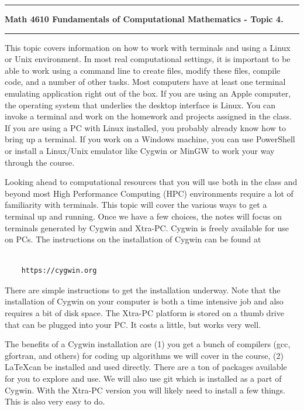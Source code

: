 \documentclass[10pt,fleqn]{article}
\begin{document}
\vskip0.1in\hrule\vskip0.1in
\noindent
{\bf Math 4610 Fundamentals of Computational Mathematics  - Topic 4.}
\vskip0.1in\hrule\vskip0.1in

This topic covers information on how to work with terminals and using a Linux
or Unix environment. In most real computational settings, it is important to be
able to work using a command line to create files, modify these files, compile
code, and a number of other tasks. Most computers have at least one terminal
emulating application right out of the box. If you are using an Apple computer,
the operating system that underlies the desktop interface is Linux. You can
invoke a terminal and work on the homework and projects assigned in the class.
If you are using a PC with Linux installed, you probably already know how to
bring up a terminal. If you work on a Windows machine, you can use PowerShell
or install a Linux/Unix emulator like Cygwin or MinGW to work your way through
the course.

Looking ahead to computational resources that you will use both in the class and
beyond most High Performance Computing (HPC) environments require a lot of
familiarity with terminals. This topic will cover the various ways to get a
terminal up and running. Once we have a few choices, the notes will focus on
terminals generated by Cygwin and Xtra-PC. Cygwin is freely available for use
on PCs. The instructions on the installation of Cygwin can be found at
\begin{verbatim}

    https://cygwin.org

\end{verbatim}
There are simple instructions to get the installation underway. Note that the
installation of Cygwin on your computer is both a time intensive job and also
requires a bit of disk space. The Xtra-PC platform is stored on a thumb drive
that can be plugged into your PC. It costs a little, but works very well.

The benefits of a Cygwin installation are (1) you get a bunch of compilers (gcc,
gfortran, and others) for coding up algorithms we will cover in the course, (2)
\LaTeX can be installed and used directly. There are a ton of packages available
for you to explore and use. We will also use git which is installed as a part of
Cygwin. With the Xtra-PC version you will likely need to install a few things.
This is also very easy to do.
\end{document}
